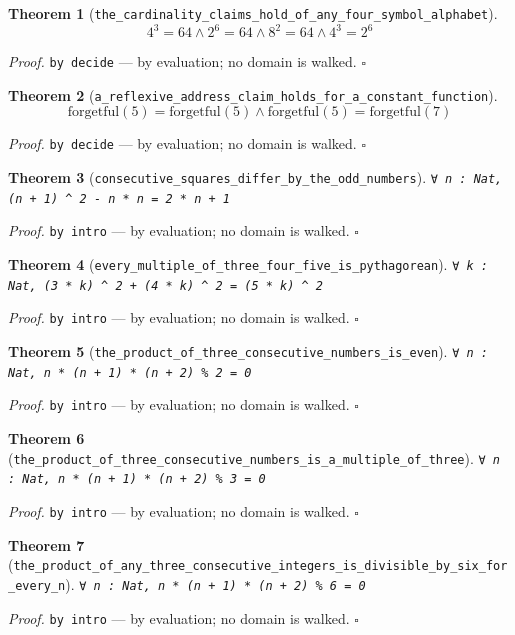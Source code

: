 \documentclass[11pt]{article}
\newtheorem{theorem}{Theorem}[section]
\begin{document}
\begin{theorem}[\texttt{the\_cardinality\_claims\_hold\_of\_any\_four\_symbol\_alphabet}]
\[ 4^{3} = 64 \land 2^{6} = 64 \land 8^{2} = 64 \land 4^{3} = 2^{6} \]
\end{theorem}
\noindent\emph{Proof.} \texttt{by decide} --- by evaluation; no domain is walked. \hfill$\square$

\begin{theorem}[\texttt{a\_reflexive\_address\_claim\_holds\_for\_a\_constant\_function}]
\[ \mathrm{forgetful}\mathopen{}\left(5\right) = \mathrm{forgetful}\mathopen{}\left(5\right) \land \mathrm{forgetful}\mathopen{}\left(5\right) = \mathrm{forgetful}\mathopen{}\left(7\right) \]
\end{theorem}
\noindent\emph{Proof.} \texttt{by decide} --- by evaluation; no domain is walked. \hfill$\square$

\begin{theorem}[\texttt{consecutive\_squares\_differ\_by\_the\_odd\_numbers}]
\texttt{∀ n : Nat, (n + 1) ^ 2 - n * n = 2 * n + 1}
\end{theorem}
\noindent\emph{Proof.} \texttt{by
  intro} --- by evaluation; no domain is walked. \hfill$\square$

\begin{theorem}[\texttt{every\_multiple\_of\_three\_four\_five\_is\_pythagorean}]
\texttt{∀ k : Nat, (3 * k) ^ 2 + (4 * k) ^ 2 = (5 * k) ^ 2}
\end{theorem}
\noindent\emph{Proof.} \texttt{by
  intro} --- by evaluation; no domain is walked. \hfill$\square$

\begin{theorem}[\texttt{the\_product\_of\_three\_consecutive\_numbers\_is\_even}]
\texttt{∀ n : Nat, n * (n + 1) * (n + 2) \% 2 = 0}
\end{theorem}
\noindent\emph{Proof.} \texttt{by
  intro} --- by evaluation; no domain is walked. \hfill$\square$

\begin{theorem}[\texttt{the\_product\_of\_three\_consecutive\_numbers\_is\_a\_multiple\_of\_three}]
\texttt{∀ n : Nat, n * (n + 1) * (n + 2) \% 3 = 0}
\end{theorem}
\noindent\emph{Proof.} \texttt{by
  intro} --- by evaluation; no domain is walked. \hfill$\square$

\begin{theorem}[\texttt{the\_product\_of\_any\_three\_consecutive\_integers\_is\_divisible\_by\_six\_for\_every\_n}]
\texttt{∀ n : Nat, n * (n + 1) * (n + 2) \% 6 = 0}
\end{theorem}
\noindent\emph{Proof.} \texttt{by
  intro} --- by evaluation; no domain is walked. \hfill$\square$
\end{document}
